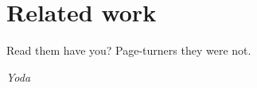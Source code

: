 \part{Related work}
\label{p:related}
\epigraph{Read them have you? Page-turners they were not.}{\textit{Yoda}}


